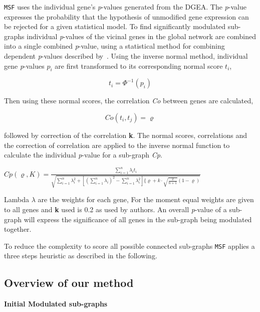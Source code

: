\documentclass[twocolumn]{article}
\begin{document}
\texttt{MSF} uses the individual gene's \textit{p}-values generated
from the DGEA. The \textit{p}-value
expresses the probability that the hypothesis of unmodified gene
expression can be rejected for a given statistical model. To find
significantly modulated sub-graphs individual \textit{p}-values of the
vicinal genes in the global network are combined into a single
combined \textit{p}-value, using a statistical method for combining
dependent \textit{p}-values described by~\cite{Hartung}. Using the
inverse normal method, individual gene \textit{p}-values $p_i$ are
first transformed to its corresponding normal score $t_i$,

\[ t_i = \Phi^{-1}(p_i) \]  

Then using these normal scores, the correlation \textit{Co} between genes are calculated, 

\[ Co (t_i, t_j) =\varrho \]

followed by correction of the correlation \textbf{k}. The normal
scores, correlations and the correction of correlation are applied to
the inverse normal function to calculate the individual
\textit{p}-value for a sub-graph \textit{Cp}. \newline

$  {\scriptstyle Cp(\varrho,K) = \frac{\sum_{i=1}^{n} \lambda_i t_i}{\sqrt{\sum_{i=1}^{n} \lambda_i^2 +[(\sum_{i=1}^{n} \lambda_i)^2- \sum_{i=1}^{n} \lambda_i^2]\{\varrho+k\cdot\sqrt{\frac{2}{n+1}} (1-\varrho)}}} $\\ \newline

Lambda $\lambda$ are the weights for each gene, For the moment equal
weights are given to all genes and \textbf{k} used is 0.2 as used by authors. An
overall \textit{p}-value of a sub-graph will express the significance
of all genes in the sub-graph being modulated together.

To reduce the complexity to score all possible connected sub-graphs
\texttt{MSF} applies a three steps heuristic as described in the
following.\newline
 
\subsection*{Overview of our method}

\textbf{Initial Modulated sub-graphs}
\end{document}
